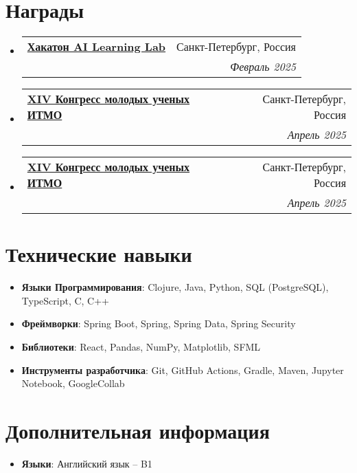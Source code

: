 \documentclass[letterpaper,11pt]{article}
\makeatletter
\newcommand{\resumeItem}[2]{
  \item\small{
    \textbf{#1}{: #2 \vspace{-2pt}}
  }
}
\newcommand{\resumeSubItem}[2]{\resumeItem{#1}{#2}\vspace{-4pt}}
\newcommand{\resumeSubHeadingListStart}{\begin{itemize}[leftmargin=*]}
\newcommand{\resumeSubHeadingListEnd}{\end{itemize}}
\newcommand{\resumeAwardSubheading}[4]{
  \vspace{-1pt}\item
    \begin{tabular*}{0.97\textwidth}[t]{p{0.67\textwidth}@{\extracolsep{\fill}}r}
      \textbf{#1} & #2 \\
      \textit{\small\parbox[t]{0.67\textwidth}{\raggedright #3}} & \textit{\small #4} \\
    \end{tabular*}\vspace{-5pt}
}
\makeatother
\begin{document}
\section{Награды}
\resumeSubHeadingListStart
\resumeAwardSubheading{
    \href{https://drive.google.com/file/d/1gs8khjhjMai1iDpcuySTskslkZBpb5XG/view?usp=drive_link}
    {Хакатон AI Learning Lab}}{Санкт-Петербург, Россия}
{\textbf{Победитель}. Разработка платформы разметки данных для повышения качества обучения нейронных сетей.}{Февраль 2025}
\resumeAwardSubheading{
    \href{https://drive.google.com/file/d/1QIoI3PejwaDDYfFeW4Al2UtjX8WS3nBv/view?usp=drive_link}
    {XIV Конгресс молодых ученых ИТМО}}{Санкт-Петербург, Россия}
{\textbf{Победитель номинации "Лучший доклад молодого ученого"}. Проект "Разработка сервиса разметки данных для обучения нейронных сетей"}{Апрель 2025}
\resumeAwardSubheading{
    \href{https://drive.google.com/file/d/1w0LCMTmXbGLRT5wyzHR6HV2Q5f1fHShN/view?usp=drive_links}
    {XIV Конгресс молодых ученых ИТМО}}{Санкт-Петербург, Россия}
{\textbf{Победитель номинации "Лучший доклад молодого ученого"}. Проект "Разработка open-source инструмента автоматизированного машинного обучения с использованием больших языковых моделей"}{Апрель 2025}
\resumeSubHeadingListEnd


\section{Технические навыки}
\resumeSubHeadingListStart
\resumeSubItem{Языки Программирования}{Clojure, Java, Python, SQL (PostgreSQL), TypeScript, C, C++}
\resumeSubItem{Фреймворки}{Spring Boot, Spring, Spring Data, Spring Security}
\resumeSubItem{Библиотеки}{React, Pandas, NumPy, Matplotlib, SFML}
\resumeSubItem{Инструменты разработчика}{Git, GitHub Actions, Gradle, Maven, Jupyter Notebook, GoogleCollab}
\resumeSubHeadingListEnd
\section{Дополнительная информация}
\resumeSubHeadingListStart
\resumeSubItem{Языки}{Английский язык -- B1}
\resumeSubHeadingListEnd
\end{document}
